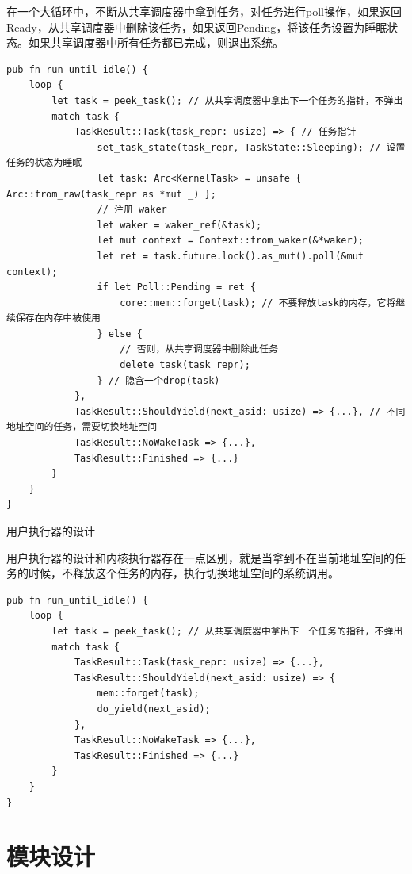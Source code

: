 在一个大循环中，不断从共享调度器中拿到任务，对任务进行poll操作，如果返回Ready，从共享调度器中删除该任务，如果返回Pending，将该任务设置为睡眠状态。如果共享调度器中所有任务都已完成，则退出系统。

\begin{lstlisting}[caption=内核执行器的设计]
pub fn run_until_idle() {
    loop {
        let task = peek_task(); // 从共享调度器中拿出下一个任务的指针，不弹出
        match task {
            TaskResult::Task(task_repr: usize) => { // 任务指针
                set_task_state(task_repr, TaskState::Sleeping); // 设置任务的状态为睡眠
                let task: Arc<KernelTask> = unsafe { Arc::from_raw(task_repr as *mut _) };
                // 注册 waker
                let waker = waker_ref(&task);
                let mut context = Context::from_waker(&*waker);
                let ret = task.future.lock().as_mut().poll(&mut context);
                if let Poll::Pending = ret {
                    core::mem::forget(task); // 不要释放task的内存，它将继续保存在内存中被使用
                } else {
                    // 否则，从共享调度器中删除此任务
                    delete_task(task_repr);
                } // 隐含一个drop(task)
            },
            TaskResult::ShouldYield(next_asid: usize) => {...}, // 不同地址空间的任务，需要切换地址空间
            TaskResult::NoWakeTask => {...},
            TaskResult::Finished => {...}
        }
    }
}
\end{lstlisting}

用户执行器的设计

用户执行器的设计和内核执行器存在一点区别，就是当拿到不在当前地址空间的任务的时候，不释放这个任务的内存，执行切换地址空间的系统调用。

\begin{lstlisting}[caption=用户执行器的设计]
pub fn run_until_idle() {
    loop {
        let task = peek_task(); // 从共享调度器中拿出下一个任务的指针，不弹出
        match task {
            TaskResult::Task(task_repr: usize) => {...},
            TaskResult::ShouldYield(next_asid: usize) => {
                mem::forget(task);
                do_yield(next_asid);
            },
            TaskResult::NoWakeTask => {...},
            TaskResult::Finished => {...}
        }
    }
}
\end{lstlisting}

\section{模块设计}

